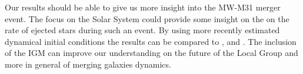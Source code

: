 \documentclass[10pt,english]{article}
\begin{document}
\smallskip
Our results should be able to give us more insight into the MW-M31 merger event. The focus on the Solar System could provide some insight on the on the rate of ejected stars during such an event. By using more recently estimated dynamical initial conditions the results can be compared to \textcite{Cox_2008}, \textcite{van_der_Marel_2012b} and \textcite{Schiavi_2019}. The inclusion of the IGM can improve our understanding on the future of the Local Group and more in general of merging galaxies dynamics.\par
\smallskip

\end{document}
